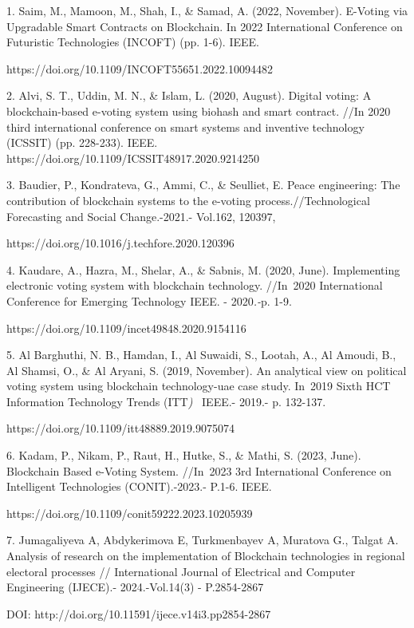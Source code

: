 \begin{noparindent}
1. Saim, M., Mamoon, M., Shah, I., \& Samad, A. (2022, November).
E-Voting via Upgradable Smart Contracts on Blockchain. In 2022
International Conference on Futuristic Technologies (INCOFT) (pp. 1-6).
IEEE.

https://doi.org/10.1109/INCOFT55651.2022.10094482

2. Alvi, S. T., Uddin, M. N., \& Islam, L. (2020, August). Digital
voting: A blockchain-based e-voting system using biohash and smart
contract. //In 2020 third international conference on smart systems and
inventive technology (ICSSIT) (pp. 228-233). IEEE.
https://doi.org/10.1109/ICSSIT48917.2020.9214250

3. Baudier, P., Kondrateva, G., Ammi, C., \& Seulliet, E. Peace
engineering: The contribution of blockchain systems to the e-voting
process.//Technological Forecasting and Social Change.-2021.- Vol.162,
120397,

https://doi.org/10.1016/j.techfore.2020.120396

4. Kaudare, A., Hazra, M., Shelar, A., \& Sabnis, M. (2020, June).
Implementing electronic voting system with blockchain technology.
//In~2020 International Conference for Emerging Technology IEEE. -
2020\emph{.-}p. 1-9.

https://doi.org/10.1109/incet49848.2020.9154116

5. Al Barghuthi, N. B., Hamdan, I., Al Suwaidi, S., Lootah, A., Al
Amoudi, B., Al Shamsi, O., \& Al Aryani, S. (2019, November). An
analytical view on political voting system using blockchain
technology-uae case study. In~2019 Sixth HCT Information Technology
Trends (ITT\emph{)}~ IEEE.- 2019.- p. 132-137.

https://doi.org/10.1109/itt48889.2019.9075074

6. Kadam, P., Nikam, P., Raut, H., Hutke, S., \& Mathi, S. (2023, June).
Blockchain Based e-Voting System. //In~2023 3rd International Conference
on Intelligent Technologies (CONIT).-2023.- P.1-6. IEEE.

https://doi.org/10.1109/conit59222.2023.10205939

7. Jumagaliyeva A, Abdykerimova E, Turkmenbayev A, Muratova G., Talgat
A. Analysis of research on the implementation of Blockchain technologies
in regional electoral processes // International Journal of Electrical
and Computer Engineering (IJECE).- 2024.-Vol.14(3) - P.2854-2867

DOI: http://doi.org/10.11591/ijece.v14i3.pp2854-2867


\end{noparindent}
